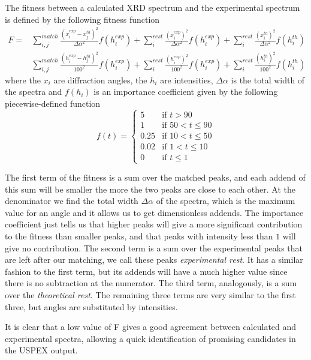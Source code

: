 \documentclass{article}
\begin{document}
The fitness between a calculated XRD spectrum and the experimental spectrum is defined by the following fitness function
\begin{align*}
	F = &\sum_{i, j}^{match} \frac{(x_i^{exp} - x_j^{th})^2}{\Delta \alpha^2} f(h_i^{exp}) + \sum_i^{rest} \frac{(x_i^{exp})^2}{\Delta \alpha^2} f(h_i^{exp}) + \sum_i^{rest} \frac{(x_i^{th})^2}{\Delta \alpha^2} f(h_i^{th}) \\
	&\sum_{i, j}^{match} \frac{(h_i^{exp} - h_j^{th})^2}{100^2} f(h_i^{exp}) + \sum_i^{rest} \frac{(h_i^{exp})^2}{100^2} f(h_i^{exp}) + \sum_i^{rest} \frac{(h_i^{th})^2}{100^2} f(h_i^{th})
\end{align*}
where the $x_i$ are diffraction angles, the $h_i$ are intensities, $\Delta \alpha$ is the total width of the spectra and $f(h_i)$ is an importance coefficient given by the following piecewise-defined function
\begin{equation*}
	f(t)=
	\begin{cases}
		5 & \text{if $t > 90$} \\
		1 & \text{if $50 < t \le 90$} \\
		0.25 & \text{if $10 < t \le 50$} \\
		0.02 & \text{if $1 < t \le 10$} \\
		0 & \text{if $t \le 1$}
	\end{cases}
\end{equation*}

The first term of the fitness is a sum over the matched peaks, and each addend of this sum will be smaller the more the two peaks are close to each other. At the denominator we find the total width $\Delta \alpha$ of the spectra, which is the maximum value for an angle and it allows us to get dimensionless addends. The importance coefficient just tells us that higher peaks will give a more significant contribution to the fitness than smaller peaks, and that peaks with intensity less than $1$ will give no contribution. The second term is a sum over the experimental peaks that are left after our matching, we call these peaks \emph{experimental rest}. It has a similar fashion to the first term, but its addends will have a much higher value since there is no subtraction at the numerator. The third term, analogously, is a sum over the \emph{theoretical rest}. The remaining three terms are very similar to the first three, but angles are substituted by intensities.

It is clear that a low value of F gives a good agreement between calculated and experimental spectra, allowing a quick identification of promising candidates in the USPEX output.
\end{document}
